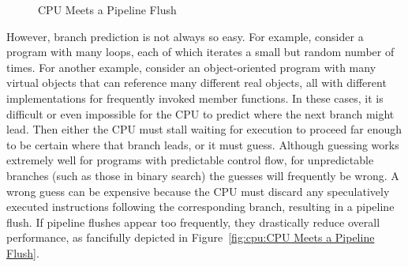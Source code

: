 \begin{figure}[tb]
\begin{center}
\end{center}
\caption{CPU Meets a Pipeline Flush}
\end{figure}

However, branch prediction is not always so easy.
For example, consider a program with many loops, each of which iterates
a small but random number of times.
For another example, consider
an object-oriented program with many virtual objects that
can reference many different real objects, all with different implementations
for frequently invoked member functions.
In these cases, it is difficult or even
impossible for the CPU to predict where the next branch might lead.
Then either the CPU must stall waiting for execution to proceed far
enough to be certain where that branch leads, or it must guess.
Although guessing works extremely well for programs with predictable
control flow, for unpredictable branches (such as those in binary search)
the guesses will frequently be wrong.
A wrong guess can be expensive because the CPU must discard any
speculatively executed instructions following the corresponding
branch, resulting in a pipeline flush.
If pipeline flushes appear too frequently, they drastically reduce
overall performance, as fancifully depicted in
Figure~\ref{fig:cpu:CPU Meets a Pipeline Flush}.

